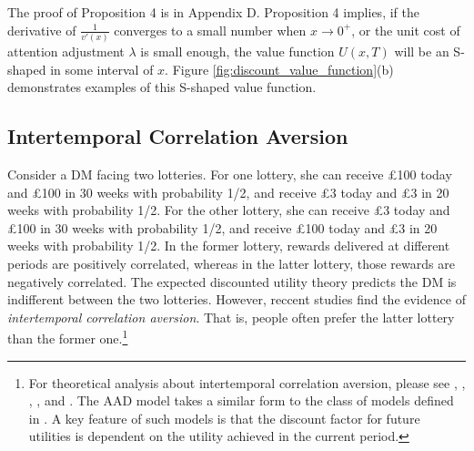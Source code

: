 \documentclass[
  12pt,
]{article}
\begin{document}
The proof of Proposition 4 is in Appendix D. Proposition 4 implies, if
the derivative of \(\frac{1}{v'(x)}\) converges to a small number when
\(x\rightarrow 0^+\), or the unit cost of attention adjustment
\(\lambda\) is small enough, the value function \(U(x,T)\) will be an
S-shaped in some interval of \(x\). Figure
\ref{fig:discount_value_function}(b) demonstrates examples of this
S-shaped value function.

\hypertarget{intertemporal-correlation-aversion}{%
\subsection{Intertemporal Correlation
Aversion}\label{intertemporal-correlation-aversion}}

Consider a DM facing two lotteries. For one lottery, she can receive
£100 today and £100 in 30 weeks with probability 1/2, and receive £3
today and £3 in 20 weeks with probability 1/2. For the other lottery,
she can receive £3 today and £100 in 30 weeks with probability 1/2, and
receive £100 today and £3 in 20 weeks with probability 1/2. In the
former lottery, rewards delivered at different periods are positively
correlated, whereas in the latter lottery, those rewards are negatively
correlated. The expected discounted utility theory predicts the DM is
indifferent between the two lotteries. However, reccent studies find the
evidence of \emph{intertemporal correlation
aversion}\citep{andersen2018multiattribute, rohde2023intertemporal}.
That is, people often prefer the latter lottery than the former
one.\footnote{For theoretical analysis about intertemporal correlation
  aversion, please see \citet{epstein1983stationary},
  \citet{epstein1989substitution}, \citet{weil1990nonexpected},
  \citet{bommier2005risk}, and \citet{bommier2017monotone}. The AAD
  model takes a similar form to the class of models defined in
  \citet{epstein1983stationary}. A key feature of such models is that
  the discount factor for future utilities is dependent on the utility
  achieved in the current period.}
\end{document}
